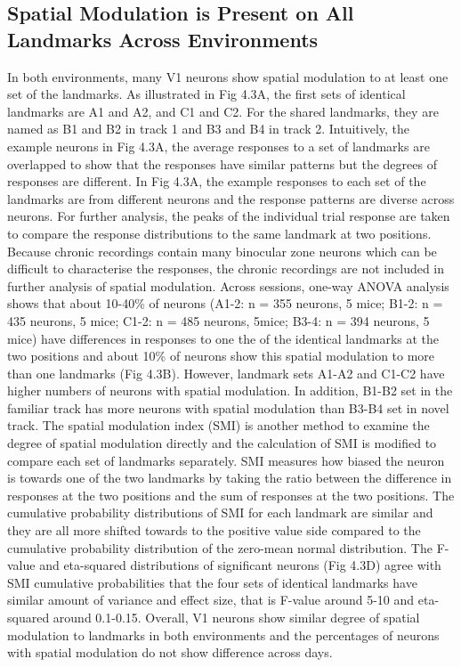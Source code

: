 \subsection{Spatial Modulation is Present on All Landmarks Across Environments}
In both environments, many V1 neurons show spatial modulation to at least one set of the landmarks. As illustrated in Fig 4.3A, the first sets of identical landmarks are A1 and A2, and C1 and C2. For the shared landmarks, they are named as B1 and B2 in track 1 and B3 and B4 in track 2. Intuitively, the example neurons in Fig 4.3A, the average responses to a set of landmarks are overlapped to show that the responses have similar patterns but the degrees of responses are different. In Fig 4.3A, the example responses to each set of the landmarks are from different neurons and the response patterns are diverse across neurons. For further analysis, the peaks of the individual trial response are taken to compare the response distributions to the same landmark at two positions. Because chronic recordings contain many binocular zone neurons which can be difficult to characterise the responses, the chronic recordings are not included in further analysis of spatial modulation. Across sessions, one-way ANOVA analysis shows that about 10-40\% of neurons (A1-2: n = 355 neurons, 5 mice; B1-2: n = 435 neurons, 5 mice; C1-2: n = 485 neurons, 5mice; B3-4: n = 394 neurons, 5 mice) have differences in responses to one the of the identical landmarks at the two positions and about 10\% of neurons show this spatial modulation to more than one landmarks (Fig 4.3B). However, landmark sets A1-A2 and C1-C2 have higher numbers of neurons with spatial modulation. In addition, B1-B2 set in the familiar track has more neurons with spatial modulation than B3-B4 set in novel track. The spatial modulation index (SMI) is another method to examine the degree of spatial modulation directly and the calculation of SMI is modified to compare each set of landmarks separately. SMI measures how biased the neuron is towards one of the two landmarks by taking the ratio between the difference in responses at the two positions and the sum of responses at the two positions. The cumulative probability distributions of SMI for each landmark are similar and they are all more shifted towards to the positive value side compared to the cumulative probability distribution of the zero-mean normal distribution. The F-value and eta-squared distributions of significant neurons (Fig 4.3D) agree with SMI cumulative probabilities that the four sets of identical landmarks have similar amount of variance and effect size, that is F-value around 5-10 and eta-squared around 0.1-0.15. Overall, V1 neurons show similar degree of spatial modulation to landmarks in both environments and the percentages of neurons with spatial modulation do not show difference across days. 

